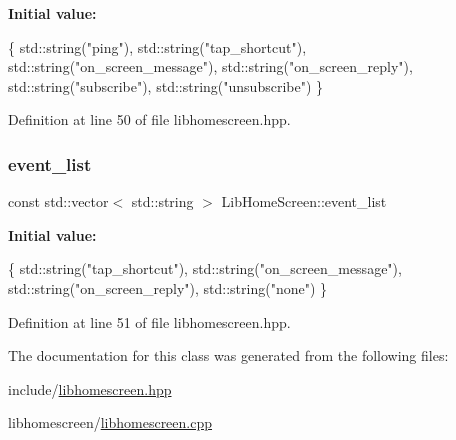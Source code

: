 {\bfseries Initial value\+:}
\begin{DoxyCode}
\{
    std::string(\textcolor{stringliteral}{"ping"}), 
    std::string(\textcolor{stringliteral}{"tap\_shortcut"}), 
    std::string(\textcolor{stringliteral}{"on\_screen\_message"}),
    std::string(\textcolor{stringliteral}{"on\_screen\_reply"}),
    std::string(\textcolor{stringliteral}{"subscribe"}),
    std::string(\textcolor{stringliteral}{"unsubscribe"})
\}
\end{DoxyCode}


Definition at line 50 of file libhomescreen.\+hpp.

\mbox{\label{class_lib_home_screen_a6a6d8a4d33a006a08652e7377a4c29e9}} 
\subsubsection{\texorpdfstring{event\+\_\+list}{event\_list}}
{\footnotesize\ttfamily const std\+::vector$<$ std\+::string $>$ Lib\+Home\+Screen\+::event\+\_\+list\hspace{0.3cm}{\ttfamily [static]}}

{\bfseries Initial value\+:}
\begin{DoxyCode}
\{
    std::string(\textcolor{stringliteral}{"tap\_shortcut"}),
    std::string(\textcolor{stringliteral}{"on\_screen\_message"}),
    std::string(\textcolor{stringliteral}{"on\_screen\_reply"}),
    std::string(\textcolor{stringliteral}{"none"})
\}
\end{DoxyCode}


Definition at line 51 of file libhomescreen.\+hpp.



The documentation for this class was generated from the following files\+:\begin{DoxyCompactItemize}
\item 
include/\hyperlink{libhomescreen_8hpp}{libhomescreen.\+hpp}\item 
libhomescreen/\hyperlink{libhomescreen_8cpp}{libhomescreen.\+cpp}\end{DoxyCompactItemize}
